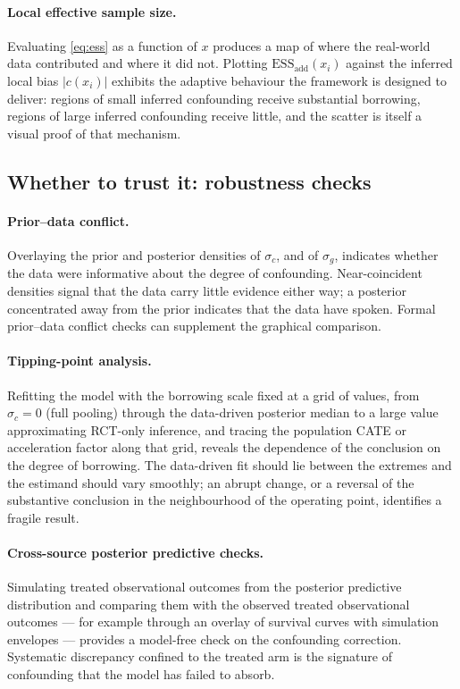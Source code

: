 \documentclass[11pt]{report}
\theoremstyle{plain}
\theoremstyle{definition}
\theoremstyle{remark}
\newcommand{\1}{\mathds{1}}
\theoremstyle{plain}
\theoremstyle{remark}
\begin{document}
\paragraph{Local effective sample size.}
Evaluating \eqref{eq:ess} as a function of $x$ produces a map of where the
real-world data contributed and where it did not. Plotting
$\mathrm{ESS}_{\text{add}}(x_i)$ against the inferred local bias $|c(x_i)|$
exhibits the adaptive behaviour the framework is designed to deliver: regions of
small inferred confounding receive substantial borrowing, regions of large
inferred confounding receive little, and the scatter is itself a visual proof of
that mechanism.

\subsection{Whether to trust it: robustness checks}

\paragraph{Prior--data conflict.}
Overlaying the prior and posterior densities of $\sigma_c$, and of $\sigma_g$,
indicates whether the data were informative about the degree of confounding.
Near-coincident densities signal that the data carry little evidence either way;
a posterior concentrated away from the prior indicates that the data have
spoken. Formal prior--data conflict checks \citep{evans2006} can supplement the
graphical comparison.

\paragraph{Tipping-point analysis.}
Refitting the model with the borrowing scale fixed at a grid of values, from
$\sigma_c = 0$ (full pooling) through the data-driven posterior median to a large
value approximating RCT-only inference, and tracing the population CATE or
acceleration factor along that grid, reveals the dependence of the conclusion on
the degree of borrowing. The data-driven fit should lie between the extremes and
the estimand should vary smoothly; an abrupt change, or a reversal of the
substantive conclusion in the neighbourhood of the operating point, identifies a
fragile result.

\paragraph{Cross-source posterior predictive checks.}
Simulating treated observational outcomes from the posterior predictive
distribution and comparing them with the observed treated observational
outcomes --- for example through an overlay of survival curves with simulation
envelopes \citep{gelman1996} --- provides a model-free check on the confounding
correction. Systematic discrepancy confined to the treated arm is the signature
of confounding that the model has failed to absorb.
\end{document}
